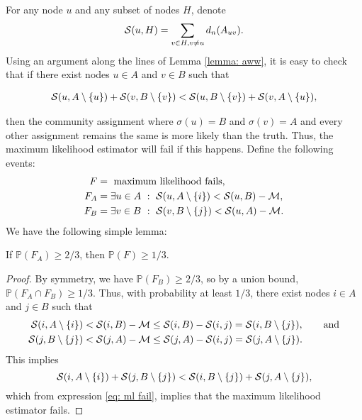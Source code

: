 For any node $u$ and any subset of nodes $H$, denote 
$${\cal S}(u , H) = \sum_{v \in H, v \neq u} d_n(A_{uv}).$$
Using an argument along the lines of Lemma \ref{lemma: aww}, it is easy to check that if there exist nodes $u \in A$ and $v \in B$ such that

\begin{align}\label{eq: ml fail}
{\cal S}(u, A\setminus \{u\}) + {\cal S}(v, B\setminus \{v\}) < {\cal S}(u, B\setminus \{v\}) + {\cal S}(v, A\setminus \{u\}),
\end{align}

then the community assignment where $\sigma(u) = B$ and $\sigma(v) = A$ and every other assignment remains the same is more likely than the truth. Thus, the maximum likelihood estimator will fail if this happens. Define the following events:
\begin{align*}
F &= \text{ maximum likelihood fails},\\
F_A &= \exists u \in A ~:~ {\cal S}(u, A \setminus \{i\}) < {\cal S}(u, B) - {\mathcal{M}},\\
F_B &= \exists v \in B ~:~ {\cal S}(v, B \setminus \{j\}) < {\cal S}(u, A) - {\mathcal{M}}.
\end{align*}
We have the following simple lemma:
\begin{lemma}\label{lemma: FA}
If $\mathbb P(F_A) \ge 2/3$, then $\mathbb P(F) \ge 1/3$.
\end{lemma}

\begin{proof}
By symmetry, we have $\mathbb P(F_B) \ge 2/3$, so by a union bound, $\mathbb P(F_A\cap F_B) \ge 1/3$. Thus, with probability at least $1/3$, there exist nodes $i\in A$ and $j \in B$ such that
\begin{align*}
{\cal S}(i, A\setminus \{i\}) & < {\cal S}(i, B) - {\mathcal{M}} \leq {\cal S}(i, B) - {\cal S}(i,j) = {\cal S}(i, B\setminus \{j\}), \qquad \text{and} \\
{\cal S}(j, B\setminus \{j\}) & < {\cal S}(j, A) - {\mathcal{M}} \leq {\cal S}(j, A) - {\cal S}(i,j) = {\cal S}(j, A\setminus \{j\}).
\end{align*}
This implies
\begin{equation*}
{\cal S}(i, A\setminus \{i\})+{\cal S}(j, B\setminus \{j\}) < {\cal S}(i, B\setminus \{j\})+{\cal S}(j, A\setminus \{j\}),
\end{equation*}
which from expression \eqref{eq: ml fail}, implies that the maximum likelihood estimator fails.
\end{proof}

